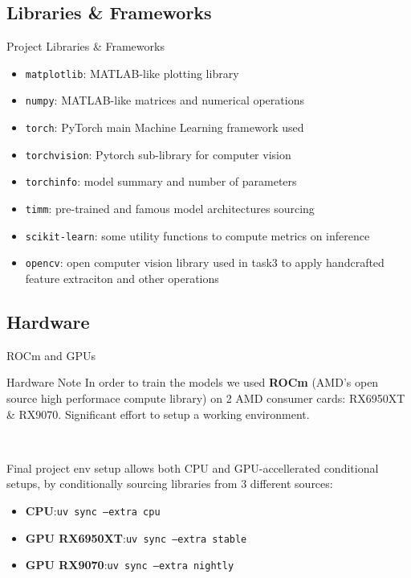 \subsection{Libraries \& Frameworks}
\begin{frame}{Project Libraries \& Frameworks}
  \begin{itemize}
    \item \texttt{matplotlib}: MATLAB-like plotting library
    \item \texttt{numpy}: MATLAB-like matrices and numerical operations
    \item \texttt{torch}: PyTorch main Machine Learning framework used
    \item \texttt{torchvision}: Pytorch sub-library for computer vision
    \item \texttt{torchinfo}: model summary and number of parameters
    \item \texttt{timm}: pre-trained and famous model architectures sourcing
    \item \texttt{scikit-learn}: some utility functions to compute metrics on inference
    \item \texttt{opencv}: open computer vision library used in task3 to apply handcrafted feature extraciton and other operations
  \end{itemize}
\end{frame}

\subsection{Hardware}
\begin{frame}{ROCm and GPUs}
  \begin{block}{Hardware Note}
    In order to train the models we used \textbf{ROCm} (AMD's open source high performace compute library) on 2 AMD consumer cards: RX6950XT \& RX9070.
    Significant effort to setup a working environment.
  \end{block}
  \pause\

  Final project env setup allows both CPU and GPU-accellerated conditional setups, by conditionally sourcing libraries from 3 different sources:
  \begin{itemize}
    \item \textbf{CPU}:\@ \texttt{uv sync --extra cpu}
    \item \textbf{GPU RX6950XT}:\@ \texttt{uv sync --extra stable}
    \item \textbf{GPU RX9070}:\@ \texttt{uv sync --extra nightly}
  \end{itemize}
\end{frame}